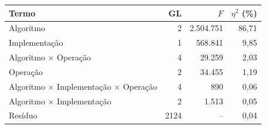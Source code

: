 \begin{tabular}{@{}lrrr@{}}
\toprule
Termo & GL & $F$ & $\eta^2$ (\%) \\
\midrule
Algoritmo & 2 & 2.504.751 & 86,71 \\
Implementação & 1 & 568.841 & 9,85 \\
Algoritmo $\times$ Operação & 4 & 29.259 & 2,03 \\
Operação & 2 & 34.455 & 1,19 \\
Algoritmo $\times$ Implementação $\times$ Operação & 4 & 890 & 0,06 \\
Algoritmo $\times$ Implementação & 2 & 1.513 & 0,05 \\
\midrule
Resíduo & 2124 & -- & 0,04 \\
\bottomrule
\end{tabular}
